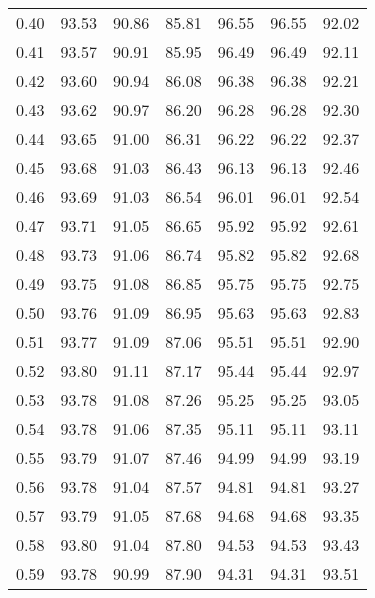 \begin{tabular}{|c|c|c|c|c|c|c|}
      0.40 &     93.53 &     90.86 &      85.81 &   96.55 &      96.55 &         92.02 \\
      0.41 &     93.57 &     90.91 &      85.95 &   96.49 &      96.49 &         92.11 \\
      0.42 &     93.60 &     90.94 &      86.08 &   96.38 &      96.38 &         92.21 \\
      0.43 &     93.62 &     90.97 &      86.20 &   96.28 &      96.28 &         92.30 \\
      0.44 &     93.65 &     91.00 &      86.31 &   96.22 &      96.22 &         92.37 \\
      0.45 &     93.68 &     91.03 &      86.43 &   96.13 &      96.13 &         92.46 \\
      0.46 &     93.69 &     91.03 &      86.54 &   96.01 &      96.01 &         92.54 \\
      0.47 &     93.71 &     91.05 &      86.65 &   95.92 &      95.92 &         92.61 \\
      0.48 &     93.73 &     91.06 &      86.74 &   95.82 &      95.82 &         92.68 \\
      0.49 &     93.75 &     91.08 &      86.85 &   95.75 &      95.75 &         92.75 \\
      0.50 &     93.76 &     91.09 &      86.95 &   95.63 &      95.63 &         92.83 \\
      0.51 &     93.77 &     91.09 &      87.06 &   95.51 &      95.51 &         92.90 \\
      0.52 &     93.80 &     91.11 &      87.17 &   95.44 &      95.44 &         92.97 \\
      0.53 &     93.78 &     91.08 &      87.26 &   95.25 &      95.25 &         93.05 \\
      0.54 &     93.78 &     91.06 &      87.35 &   95.11 &      95.11 &         93.11 \\
      0.55 &     93.79 &     91.07 &      87.46 &   94.99 &      94.99 &         93.19 \\
      0.56 &     93.78 &     91.04 &      87.57 &   94.81 &      94.81 &         93.27 \\
      0.57 &     93.79 &     91.05 &      87.68 &   94.68 &      94.68 &         93.35 \\
      0.58 &     93.80 &     91.04 &      87.80 &   94.53 &      94.53 &         93.43 \\
      0.59 &     93.78 &     90.99 &      87.90 &   94.31 &      94.31 &         93.51 \\

\end{tabular}
